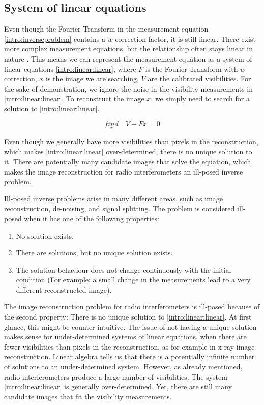 \subsection{System of linear equations}
Even though the Fourier Transform in the measurement equation \eqref{intro:inverseproblem} contains a $w$-correction factor, it is still linear. There exist more complex measurement equations, but the relationship often stays linear in nature \cite{smirnov2011revisiting1, smirnov2011revisiting2, smirnov2011revisiting3, smirnov2011revisiting4}. This means we can represent the measurement equation as a system of linear equations  \eqref{intro:linear:linear}, where $F$ is the Fourier Transform with $w$-correction, $x$ is the image we are searching, $V$ are the calibrated visibilities. For the sake of demonstration, we ignore the noise in the visibility measurements in \eqref{intro:linear:linear}. To reconstruct the image $x$, we simply need to search for a solution to \eqref{intro:linear:linear}.

\begin{equation}\label{intro:linear:linear}
\underset{x}{find}\quad V - Fx = 0
\end{equation}

Even though we generally have more visibilities than pixels in the reconstruction, which makes \eqref{intro:linear:linear} over-determined, there is no unique solution to it. There are potentially many candidate images that solve the equation, which makes the image reconstruction for radio interferometers an ill-posed inverse problem.

Ill-posed inverse problems arise in many different areas, such as image reconstruction\cite{}, de-noising\cite{}, and signal splitting\cite{}. The problem is considered ill-posed when it has one of the following properties:
\begin{enumerate}
	\item No solution exists.
	\item There are solutions, but no unique solution exists.
	\item The solution behaviour does not change continuously with the initial condition (For example: a small change in the measurements lead to a very different reconstructed image).
\end{enumerate}
The image reconstruction problem for radio interferometers is ill-posed because of the second property: There is no unique solution to \eqref{intro:linear:linear}. At first glance, this might be counter-intuitive. The issue of not having a unique solution makes sense for under-determined systems of linear equations, when there are fewer visibilities than pixels in the reconstruction, as for example in x-ray image reconstruction\cite{felix2017compressed}. Linear algebra tells us that there is a potentially infinite number of solutions to an under-determined system. However, as already mentioned, radio interferometers produce a large number of visibilities. The system \eqref{intro:linear:linear} is generally over-determined. Yet, there are still many candidate images that fit the visibility measurements.

